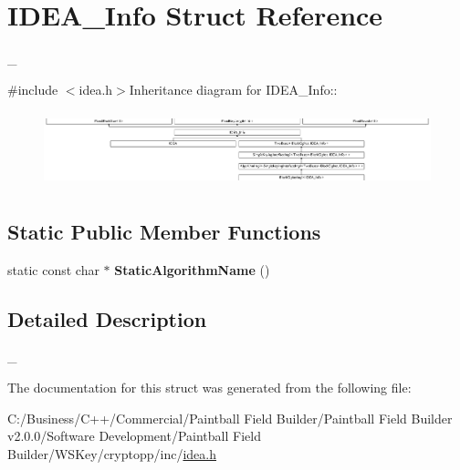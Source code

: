 \hypertarget{struct_i_d_e_a___info}{
\section{IDEA\_\-Info Struct Reference}
\label{struct_i_d_e_a___info}
}


\_\-  


{\ttfamily \#include $<$idea.h$>$}Inheritance diagram for IDEA\_\-Info::\begin{figure}[H]
\begin{center}
\leavevmode
\includegraphics[height=2.20907cm]{struct_i_d_e_a___info}
\end{center}
\end{figure}
\subsection*{Static Public Member Functions}
\begin{DoxyCompactItemize}
\item 
\hypertarget{struct_i_d_e_a___info_afd4279afa35565a65f878dc950ef2fc9}{
static const char $\ast$ {\bfseries StaticAlgorithmName} ()}
\label{struct_i_d_e_a___info_afd4279afa35565a65f878dc950ef2fc9}

\end{DoxyCompactItemize}


\subsection{Detailed Description}
\_\- 

The documentation for this struct was generated from the following file:\begin{DoxyCompactItemize}
\item 
C:/Business/C++/Commercial/Paintball Field Builder/Paintball Field Builder v2.0.0/Software Development/Paintball Field Builder/WSKey/cryptopp/inc/\hyperlink{idea_8h}{idea.h}\end{DoxyCompactItemize}
